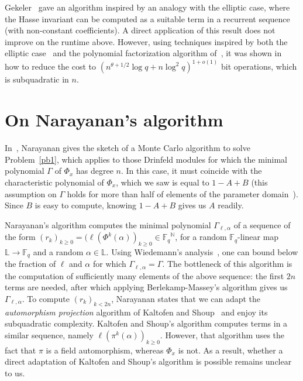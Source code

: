 \documentclass[sigconf]{acmart}
\newcommand{\F}{\mathbb{F}}
\newcommand{\N}{\mathbb{N}}
\renewcommand{\L}{\mathbb{L}}
\begin{document}
Gekeler~\cite[Prop.~3.7]{frobdist} gave an algorithm inspired by an
analogy with the elliptic case, where the Hasse invariant can be
computed as a suitable term in a recurrent sequence (with non-constant
coefficients). A direct application of this result does not improve on
the runtime above. However, using techniques inspired by both the
elliptic case~\cite{BoGaSc07} and the polynomial factorization
algorithm of~\cite{KaSh98}, it was shown
in~\cite{eschost2017arXiv171200669D} how to reduce the cost to
$(n^{\theta+1/2} \log q + n \log^2 q)^{1+o(1)}$ bit operations, which
is subquadratic in $n$.


\section{On Narayanan's algorithm}\label{sec:narayanan}

In~\cite[Section~3.1]{Narayanan18}, Narayanan gives the sketch of a
Monte Carlo algorithm to solve Problem~\ref{pb1}, which applies to
those Drinfeld modules for which the minimal polynomial $\Gamma$ of
$\Phi_x$ has degree $n$. In this case, it must coincide with the
characteristic polynomial of $\Phi_x$, which we saw is equal to
$1-A+B$ (this assumption on $\Gamma$ holds for more than half of 
elements of the parameter domain~\cite[Th.~3.6]{Narayanan18}). Since
$B$ is easy to compute, knowing $1-A+B$ gives us $A$ readily.

Narayanan's algorithm computes the minimal polynomial
$\Gamma_{\ell,\alpha}$ of a sequence of the form $(r_k)_{k \ge 0} =
(\ell(\Phi^k(\alpha))_{k\ge 0} \in {\F_q}^\N$, for a random $\F_q$-linear
map $\L\to\F_q$ and a random $\alpha \in \L$. Using Wiedemann's
analysis~\cite{Wiedemann:1986:SSL:13738.13744}, one can bound below
the fraction of $\ell$ and $\alpha$ for which
$\Gamma_{\ell,\alpha}=\Gamma$.
The bottleneck of this algorithm is the computation of sufficiently
many elements of the above sequence: the first $2n$ terms are needed,
after which applying Berlekamp-Massey's algorithm gives us
$\Gamma_{\ell,\alpha}$. To compute $(r_k)_{k < 2n}$, Narayanan states
that we can adapt the {\em automorphism projection} algorithm of
Kaltofen and Shoup~\cite{KaSh98} and enjoy its subquadratic
complexity. Kaltofen and Shoup's algorithm computes terms in a similar
sequence, namely $\ell(\pi^k(\alpha))_{k\ge 0}$. However, that
algorithm uses the fact that $\pi$ is a field automorphism, whereas
$\Phi_x$ is not. As a result, whether a direct adaptation of Kaltofen
and Shoup's algorithm is possible remains unclear to us.
\end{document}
